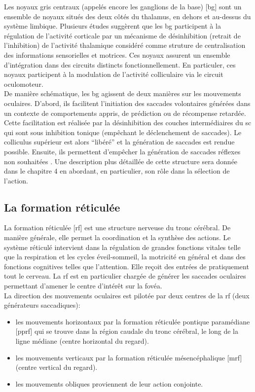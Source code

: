 Les noyaux gris centraux (appelés encore les ganglions de la base) [\gls{bg}] sont un ensemble de noyaux situés des deux côtés du thalamus, en dehors et au-dessus du système limbique. Plusieurs études suggèrent que les \gls{bg} participent à la régulation de l'activité corticale par un mécanisme de désinhibition (retrait de l'inhibition) de l'activité thalamique considéré comme struture de centralisation des informations sensorielles et motrices. Ces noyaux assurent un ensemble d'intégration dans des circuits distincts fonctionnellement. En particuler, ces noyaux participent à la modulation de l'activité colliculaire via le circuit oculomoteur. \\

De manière schématique, les \gls{bg} agissent de deux manières sur les mouvements oculaires. D'abord, ils facilitent l'initiation des saccades volontaires générées dans un contexte de comportements appris, de prédiction ou de récompense retardée. Cette facilitation est réalisée par la désinhibition des couches intermédiaires du \gls{sc} qui sont sous inhibition tonique (empêchant le déclenchement de saccades). Le colliculus supérieur est alors ``libéré'' et la génération de saccades est rendue possible. Ensuite, ils permettent d'empêcher la génération de saccades réflexes non souhaitées \cite{Leigh:2006}. Une description plus détaillée de cette structure sera donnée dans le chapitre 4 en abordant, en particulier, son rôle dans la sélection de l'action.\\

\subsection{La formation réticulée}


La formation réticulée [\gls{rf}] est une structure nerveuse du tronc cérébral. De manière générale, elle permet la coordination et la synthèse des actions. Le système réticulé intervient dans la régulation de grandes fonctions vitales telle que la respiration et les cycles éveil-sommeil, la motricité en général et dans des fonctions cognitives telles que l'attention. Elle reçoit des entrées de pratiquement tout le cerveau. La \gls{rf} est en particulier chargée de générer les saccades oculaires permettant d'amener le centre d'intérêt sur la fovéa.\\

La direction des mouvements oculaires est pilotée par deux centres de la \gls{rf} (deux générateurs saccadiques):
\begin{itemize}
\item les mouvements horizontaux par la formation réticulée pontique paramédiane [\gls{pprf}] qui se trouve dans la région caudale du tronc cérébral, le long de la ligne médiane (centre horizontal du regard).
\item les mouvements verticaux par la formation réticulée mésencéphalique [\gls{mrf}] (centre vertical du regard). 
\item les mouvements obliques proviennent de leur action conjointe.\\
 \end{itemize}

